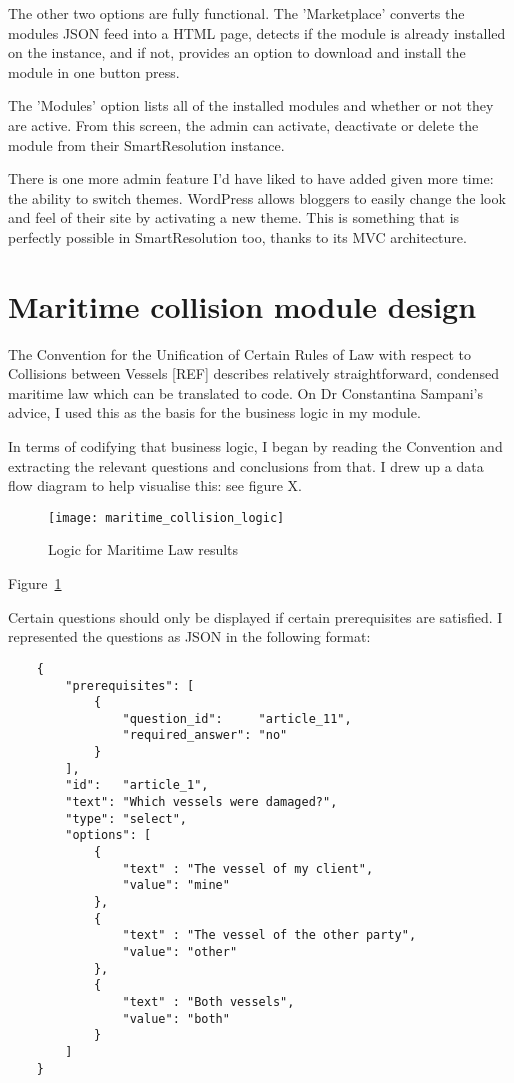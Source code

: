 The other two options are fully functional. The 'Marketplace' converts the modules JSON feed into a HTML page, detects if the module is already installed on the instance, and if not, provides an option to download and install the module in one button press.

The 'Modules' option lists all of the installed modules and whether or not they are active. From this screen, the admin can activate, deactivate or delete the module from their SmartResolution instance.

There is one more admin feature I'd have liked to have added given more time: the ability to switch themes. WordPress allows bloggers to easily change the look and feel of their site by activating a new theme. This is something that is perfectly possible in SmartResolution too, thanks to its MVC architecture.

\section{Maritime collision module design}

The Convention for the Unification of Certain Rules of Law with respect to Collisions between Vessels [REF] describes relatively straightforward, condensed maritime law which can be translated to code. On Dr Constantina Sampani's advice, I used this as the basis for the business logic in my module. %

In terms of codifying that business logic, I began by reading the Convention and extracting the relevant questions and conclusions from that. I drew up a data flow diagram to help visualise this: see figure X.

\begin{figure}[h!]
  \centering
    \texttt{[image: maritime\_collision\_logic]}
  \caption{Logic for Maritime Law results}
  \label{uml:maritimeLogic}
\end{figure}

Figure~\ref{uml:maritimeLogic}

Certain questions should only be displayed if certain prerequisites are satisfied. I represented the questions as JSON in the following format:

\begin{lstlisting}
    {
        "prerequisites": [
            {
                "question_id":     "article_11",
                "required_answer": "no"
            }
        ],
        "id":   "article_1",
        "text": "Which vessels were damaged?",
        "type": "select",
        "options": [
            {
                "text" : "The vessel of my client",
                "value": "mine"
            },
            {
                "text" : "The vessel of the other party",
                "value": "other"
            },
            {
                "text" : "Both vessels",
                "value": "both"
            }
        ]
    }
\end{lstlisting}

